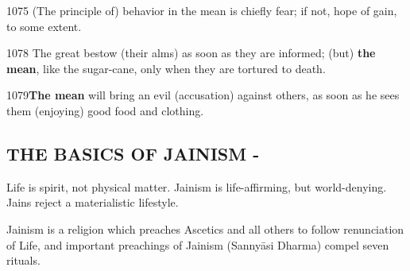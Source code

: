 1075 (The principle of) behavior in the mean is chiefly fear; if not, hope of gain, to some extent. 

1078 The great bestow (their alms) as soon as they are informed; (but) \textbf{the mean}, like the sugar-cane, only when they are tortured to death. 

1079\textbf{The mean} will bring an evil (accusation) against others, as soon as he sees them (enjoying) good food and clothing.


\subsection*{THE BASICS OF JAINISM - }

Life is spirit, not physical matter. Jainism is life-affirming, but world-denying. Jains reject a materialistic lifestyle.

Jainism is a religion which preaches Ascetics and all others to follow renunciation of Life, and important preachings of Jainism (Sannyāsi Dharma) compel seven rituals.

